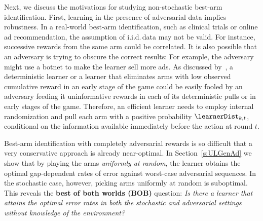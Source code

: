 Next, we discuss the motivations for studying non-stochastic best-arm identification. 
First, learning in the presence of adversarial data implies robustness. In a real-world best-arm 
identification, such as clinical trials or online ad recommendation, 
the assumption of i.i.d.\,data may not be valid. For instance, successive rewards from the same arm could
be correlated. It is also possible that an  
adversary is trying to obscure the correct results: For example, the adversary might use a 
botnet to make the learner sell more ads. %
As discussed 
by~\citet[Section~3]{Bubeck12RA},
a deterministic learner or a learner that eliminates arms with low observed cumulative reward in an early stage of the game
could be easily fooled by an 
adversary feeding it uninformative rewards in each of 
its deterministic pulls or in early stages of the game. 
Therefore, an efficient learner needs to
employ internal randomization and pull each arm with a positive probability 
$\learnerDist_{k,t}$, conditional on the information available immediately
before the action at round $t$.

Best-arm identification with
completely adversarial rewards is so difficult that a very conservative approach is already near-optimal. In Section~\ref{s:ULGenAd} we show that by playing the arms \emph{uniformly at random}, the  
learner obtains the optimal gap-dependent rates of error 
against worst-case adversarial sequences.
In the stochastic case, however, picking arms uniformly at random is 
suboptimal. This reveals the \textbf{\textcolor{pearOne}{best of both worlds (BOB)}} 
question: \emph{Is there a learner that attains the 
	optimal error rates in both the stochastic and adversarial settings 
	without knowledge of the environment?}



